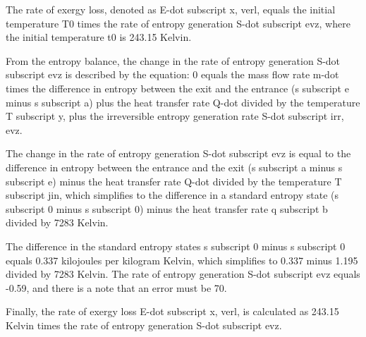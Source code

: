 The rate of exergy loss, denoted as E-dot subscript x, verl, equals the initial temperature T0 times the rate of entropy generation S-dot subscript evz, where the initial temperature t0 is 243.15 Kelvin.

From the entropy balance, the change in the rate of entropy generation S-dot subscript evz is described by the equation:
0 equals the mass flow rate m-dot times the difference in entropy between the exit and the entrance (s subscript e minus s subscript a) plus the heat transfer rate Q-dot divided by the temperature T subscript y, plus the irreversible entropy generation rate S-dot subscript irr, evz.

The change in the rate of entropy generation S-dot subscript evz is equal to the difference in entropy between the entrance and the exit (s subscript a minus s subscript e) minus the heat transfer rate Q-dot divided by the temperature T subscript jin, which simplifies to the difference in a standard entropy state (s subscript 0 minus s subscript 0) minus the heat transfer rate q subscript b divided by 7283 Kelvin.

The difference in the standard entropy states s subscript 0 minus s subscript 0 equals 0.337 kilojoules per kilogram Kelvin, which simplifies to 0.337 minus 1.195 divided by 7283 Kelvin.
The rate of entropy generation S-dot subscript evz equals -0.59, and there is a note that an error must be 70.

Finally, the rate of exergy loss E-dot subscript x, verl, is calculated as 243.15 Kelvin times the rate of entropy generation S-dot subscript evz.